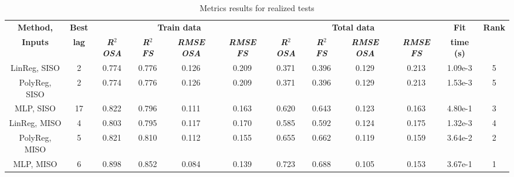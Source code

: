 \documentclass[conference]{IEEEtran}
\begin{document}
\begin{table}[htbp]
\caption{Metrics results for realized tests}
\begin{center}
\begin{tabular}{|c|c|c|c|c|c|c|c|c|c|c|c|}
\hline
\textbf{Method,}&\textbf{Best}&\multicolumn{4}{|c|}{\textbf{Train data}}&\multicolumn{4}{|c|}{\textbf{Total data}}&\textbf{Fit}&\textbf{Rank} \\
\cline{3-10} 
\textbf{Inputs} & \textbf{lag} & \textbf{\textit{R$^{\mathrm{2}}$ OSA}}& \textbf{\textit{R$^{\mathrm{2}}$ FS}}& \textbf{\textit{RMSE OSA}}& \textbf{\textit{RMSE FS}}& \textbf{\textit{R$^{\mathrm{2}}$ OSA}}& \textbf{\textit{R$^{\mathrm{2}}$ FS}} & \textbf{\textit{RMSE OSA}}& \textbf{\textit{RMSE FS}}&\textbf{time (s)}& \\
\hline
LinReg, SISO &  2 & 0.774 & 0.776 & 0.126 & 0.209 & 0.371 & 0.396 & 0.129 & 0.213&1.09e-3&5\\
\hline
PolyReg, SISO&  2 & 0.774 & 0.776 & 0.126 & 0.209 & 0.371 & 0.396 & 0.129 & 0.213&1.53e-3&5\\
\hline
MLP, SISO    & 17 & 0.822 & 0.796 & 0.111 & 0.163 & 0.620 & 0.643 & 0.123 & 0.163&4.80e-1&3\\
\hline
LinReg, MISO &  4 & 0.803 & 0.795 & 0.117 & 0.170 & 0.585 & 0.592 & 0.124 & 0.175&1.32e-3&4\\
\hline
PolyReg, MISO&  5 & 0.821 & 0.810 & 0.112 & 0.155 & 0.655 & 0.662 & 0.119 & 0.159&3.64e-2&2\\
\hline
MLP, MISO    &  6 & 0.898 & 0.852 & 0.084 & 0.139 & 0.723 & 0.688 & 0.105 & 0.153&3.67e-1&1\\
\hline
\end{tabular}
\label{main_results}
\end{center}
\end{table}
\end{document}

